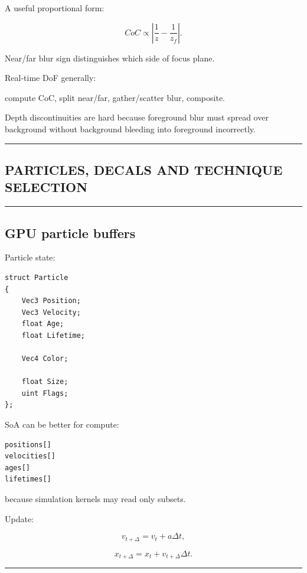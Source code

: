 A useful proportional form:

\[
CoC
\propto
\left|
\frac1z-
\frac1{z_f}
\right|.
\]

Near/far blur sign distinguishes which side of focus plane.

Real-time DoF generally:

compute CoC, split near/far, gather/scatter blur, composite.

Depth discontinuities are hard because foreground blur must spread over background without background bleeding into foreground incorrectly.

\begin{center}\rule{0.5\linewidth}{0.5pt}\end{center}

\subsection{PARTICLES, DECALS AND TECHNIQUE SELECTION}\label{04-visual-computing-ii-ch040-particles-decals-and-technique-selection}

\begin{center}\rule{0.5\linewidth}{0.5pt}\end{center}

\subsection{GPU particle buffers}\label{04-visual-computing-ii-ch040-gpu-particle-buffers}

Particle state:

\begin{verbatim}
struct Particle
{
    Vec3 Position;
    Vec3 Velocity;
    float Age;
    float Lifetime;

    Vec4 Color;

    float Size;
    uint Flags;
};
\end{verbatim}

SoA can be better for compute:

\begin{verbatim}
positions[]
velocities[]
ages[]
lifetimes[]
\end{verbatim}

because simulation kernels may read only subsets.

Update:

\[
v_{t+\Delta}
=
v_t+a\Delta t,
\]

\[
x_{t+\Delta}
=
x_t+v_{t+\Delta}\Delta t.
\]

\begin{center}\rule{0.5\linewidth}{0.5pt}\end{center}

